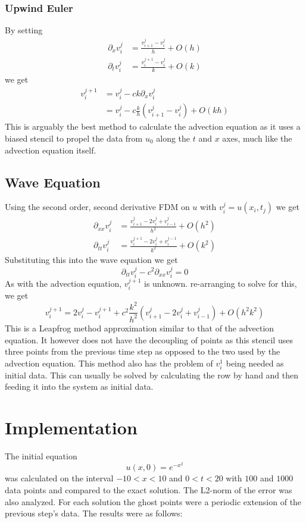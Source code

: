 \subsubsection{Upwind Euler}
By setting
\begin{align*}
    \partial_xv_i^j &= \frac{v_{i+1}^j - v_i^j}{h} + O(h) \\
    \partial_tv_i^j &= \frac{v_i^{j+1} - v_i^j}{k} + O(k)
\end{align*}
we get
\begin{align*}
    v_i^{j+1} &= v_i^j - ck\partial_xv_i^j \\
	      &= v_i^j - c\frac{k}{h}(v_{i+1}^j - v_i^j) + O(kh)
\end{align*}
This is arguably the best method to calculate the advection equation as it uses a biased stencil to propel the data from $u_0$ along the $t$ and $x$ axes, much like the advection equation itself.
\subsection{Wave Equation}
Using the second order, second derivative FDM on $u$ with $v_i^j = u(x_i,t_j)$ we get
\begin{align*}
    \partial_{xx}v_i^j &= \frac{v_{i+1}^j - 2v_i^j + v_{i-1}^j}{h^2} + O(h^2) \\
    \partial_{tt}v_i^j &= \frac{v_i^{j+1} - 2v_i^j + v_i^{j-1}}{k^2} + O(k^2)
\end{align*}
Substituting this into the wave equation we get
\begin{equation}
  \partial_{tt}v_i^j - c^2\partial_{xx}v_i^j = 0
\end{equation}
As with the advection equation, $v_i^{j+1}$ is unknown. re-arranging to solve for this, we get
\begin{equation}
  v_i^{j+1} = 2v_i^j - v_i^{j+1} + c^2\frac{k^2}{h^2}(v_{i+1}^j - 2v_i^j + v_{i-1}^j) + O(h^2k^2)
\end{equation}
This is a Leapfrog method approximation similar to that of the advection equation. It however does not have the decoupling of points as this stencil uses three points from the previous time step as opposed to the two used by the advection equation. This method also has the problem of $v_i^1$ being needed as initial data. This can usually be solved by calculating the row by hand and then feeding it into the system as initial data.
\section{Implementation}
The initial equation
\begin{equation}
  u(x,0) = e^{-x^2}
\end{equation}
was calculated on the interval $-10<x<10$ and $0<t<20$ with $100$ and $1000$ data points and compared to the exact solution. The L2-norm of the error was also analyzed. For each solution the ghost points were a periodic extension of the previous step's data. The results were as follows:
